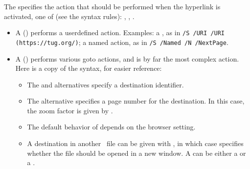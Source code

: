 \documentclass{pdftexmanual}
\begin{document}
The  specifies the action that should be
performed when the hyperlink is activated, one of (see the syntax
rules):  , 
 ,
 .

\begin{itemize}
\item A  () performs a
user\hyph defined action. Examples:
a \URL, as in \verb|/S /URI /URI (https://tug.org/)|;
a named action, as in \verb|/S /Named /N /NextPage|.

\item A  () performs various
goto actions, and is by far the most complex action. Here is a copy of
the syntax, for easier reference:


\begin{itemize}
\item The  and  alternatives specify a
destination identifier.

\item The  alternative specifies a page number for the
destination. In this case, the zoom factor is given by
.

\item The default behavior of  depends on the
browser setting.

\item A destination in another \PDF\ file can be given with
, in which case 
specifies whether the file should be opened in a new window. A
 can be either a \type{(}\type{)}
or a \type{<<}\type{>>}.


\end{itemize}
\end{itemize}
\end{document}
